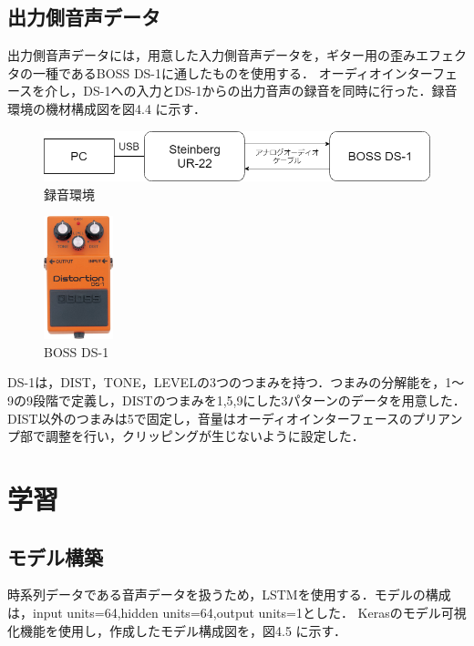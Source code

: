 \documentclass{jreport}		%
\begin{document}
\subsection{出力側音声データ}
出力側音声データには，用意した入力側音声データを，ギター用の歪みエフェクタの一種であるBOSS DS-1に通したものを使用する．
オーディオインターフェースを介し，DS-1への入力とDS-1からの出力音声の録音を同時に行った．録音環境の機材構成図を図4.4 に示す．

\begin{figure}[htbp]
 \begin{center}
  \includegraphics[width=120mm]{env.png}
 \end{center}
 \caption{録音環境}
 \label{fig:one}
\end{figure}

\begin{figure}[htbp]
 \begin{center}
  \includegraphics[width=20mm]{ds1.jpg}
 \end{center}
 \caption{BOSS DS-1}
 \label{fig:one}
\end{figure}

DS-1は，DIST，TONE，LEVELの3つのつまみを持つ．つまみの分解能を，1～9の9段階で定義し，DISTのつまみを1,5,9にした3パターンのデータを用意した．DIST以外のつまみは5で固定し，音量はオーディオインターフェースのプリアンプ部で調整を行い，クリッピングが生じないように設定した．

\section{学習}

\subsection{モデル構築}
時系列データである音声データを扱うため，LSTMを使用する．モデルの構成は，input units=64,hidden units=64,output units=1とした．
Kerasのモデル可視化機能を使用し，作成したモデル構成図を，図4.5 に示す．
\end{document}
